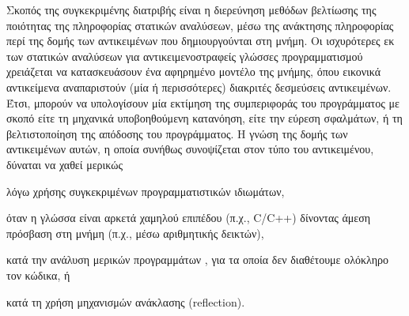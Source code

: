 


Σκοπός της συγκεκριμένης διατριβής είναι η διερεύνηση μεθόδων
βελτίωσης της ποιότητας της πληροφορίας στατικών αναλύσεων, μέσω της
ανάκτησης πληροφορίας περί της δομής των αντικειμένων που
δημιουργούνται στη μνήμη.  Οι ισχυρότερες εκ των στατικών αναλύσεων
για αντικειμενοστραφείς γλώσσες προγραμματισμού χρειάζεται να
κατασκευάσουν ένα αφηρημένο μοντέλο της μνήμης, όπου εικονικά
αντικείμενα αναπαριστούν (μία ή περισσότερες) διακριτές δεσμεύσεις
αντικειμένων.  Έτσι, μπορούν να υπολογίσουν μία εκτίμηση της
συμπεριφοράς του προγράμματος με σκοπό είτε τη μηχανικά υποβοηθούμενη
κατανόηση, είτε την εύρεση σφαλμάτων, ή τη βελτιστοποίηση της
απόδοσης του προγράμματος.  Η γνώση της δομής των αντικειμένων αυτών,
η οποία συνήθως συνοψίζεται στον τύπο του αντικειμένου, δύναται να
χαθεί μερικώς
\begin{inparaenum}[(1)]
\item λόγω χρήσης συγκεκριμένων προγραμματιστικών ιδιωμάτων,
\item όταν η γλώσσα είναι αρκετά χαμηλού επιπέδου (π.χ., {\en C/C++})
  δίνοντας άμεση πρόσβαση στη μνήμη (π.χ., μέσω αριθμητικής δεικτών),
\item κατά την ανάλυση μερικών προγραμμάτων , για τα οποία δεν
  διαθέτουμε ολόκληρο τον κώδικα, ή
\item κατά τη χρήση μηχανισμών ανάκλασης ({\en reflection}).
\end{inparaenum}

